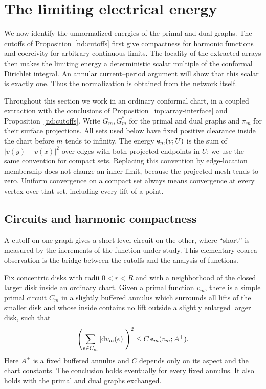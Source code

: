 \section{The limiting electrical energy}\label{sec:energy}

We now identify the unnormalized energies of the primal and dual graphs.
The cutoffs of Proposition~\ref{nd:cutoffs} first give compactness for
harmonic functions and coercivity for arbitrary continuous limits.  The
locality of the extracted arrays then makes the limiting energy a
deterministic scalar multiple of the conformal Dirichlet integral.
An annular current--period argument will show that this scalar is exactly
one.  Thus the normalization is obtained from the network itself.

Throughout this section we work in an ordinary conformal chart, in a
coupled extraction with the conclusions of
Proposition~\ref{inp:array-interface} and Proposition~\ref{nd:cutoffs}.
Write $G_m,G_m^*$ for the primal and dual graphs and $\pi_m$ for their
surface projections.  All sets used below have fixed positive clearance
inside the chart before $m$ tends to infinity.  The energy
$\mathsf e_m(v;U)$ is the sum of $|v(y)-v(x)|^2$ over edges with both projected
endpoints in $U$; we use the same convention for compact sets.  Replacing
this convention by edge-location membership does not change an inner
limit, because the projected mesh tends to zero.  Uniform convergence
on a compact set always means convergence at every vertex over that set,
including every lift of a point.

\subsection{Circuits and harmonic compactness}

A cutoff on one graph gives a short level circuit on the other, where
``short'' is measured by the increments of the function under study.
This elementary coarea observation is the bridge between the cutoffs
and the analysis of functions.

\begin{lemma}\label{en:circuit}
Fix concentric disks with radii $0<r<R$ and with a neighborhood of the
closed larger disk inside an ordinary chart.  Given a primal function
$v_m$, there is a simple primal circuit $C_m$ in a slightly buffered
annulus which surrounds all lifts of the smaller disk and whose inside
contains no lift outside a slightly enlarged larger disk, such that
\begin{equation}\label{en:circuit-bound}
 \left(\sum_{e\in C_m}|\mathrm d v_m(e)|\right)^2
 \le C\,\mathsf e_m(v_m;A^+).
\end{equation}
Here $A^+$ is a fixed buffered annulus and $C$ depends only on its aspect
and the chart constants.  The conclusion holds eventually for every
fixed annulus.  It also holds with the primal and dual graphs exchanged.
\end{lemma}

